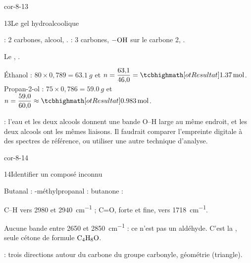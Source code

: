 \begin{blocLivre}{cor-8-13}
\begin{corrige}{13}{Le gel hydroalcoolique}
\begin{questions}
\item {} : 2 carbones, alcool, .  : 3 carbones, $\ce{-OH}$ sur le carbone 2, .
\item Le , .
\item Éthanol : $80\times0{,}789=\qty{63,1}{g}$ et $n=\dfrac{63{,}1}{46{,}0}=\res{\qty{1,37}{mol}}$. Propan-2-ol : $75\times0{,}786=\qty{59,0}{g}$ et
$n=\dfrac{59{,}0}{60{,}0}\approx\res{\qty{0,983}{mol}}$.
\item {} : l'eau et les deux alcools donnent une bande O--H large au même endroit, et les deux alcools ont les mêmes
liaisons. Il faudrait comparer l'empreinte digitale à des spectres de référence, ou utiliser une autre technique d'analyse.
\end{questions}
\end{corrige}
\end{blocLivre}
\begin{blocLivre}{cor-8-14}
\begin{corrige}{14}{Identifier un composé inconnu}
\begin{questions}
\item Butanal : -méthylpropanal : \newline butanone : 
\item C--H vers 2980 et \qty{2940}{cm^{-1}} ; C=O, forte et fine, vers \qty{1718}{cm^{-1}}.
\item Aucune bande entre 2650 et \qty{2850}{cm^{-1}} : ce n'est pas un aldéhyde. C'est la , seule cétone de formule $\ce{C4H8O}$.
\item {} : trois directions autour du carbone du groupe carbonyle,
géométrie  (triangle).
\end{questions}
\end{corrige}
\end{blocLivre}
